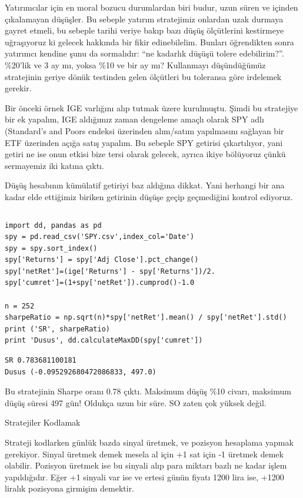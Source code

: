 \documentclass[12pt,fleqn]{article}\usepackage{../../common}
\begin{document}
Yatırımcılar için en moral bozucu durumlardan biri budur, uzun süren ve
içinden çıkalamayan düşüşler. Bu sebeple yatırım stratejimiz onlardan
uzak durmaya gayret etmeli, bu sebeple tarihi veriye bakıp bazı düşüş
ölçütlerini kestirmeye uğraşıyoruz ki gelecek hakkında bir fikir
edinebilelim. Bunları öğrendikten sonra yatırımcı kendine şunu da
sormalıdır: ``ne kadarlık düşüşü tolere edebilirim?''. \%20'lik ve 3 ay mı,
yoksa \%10 ve bir ay mı?  Kullanmayı düşündüğümüz stratejinin geriye dönük
testinden gelen ölçütleri bu toleransa göre irdelemek gerekir.

Bir önceki örnek IGE varlığını alıp tutmak üzere kurulmuştu. Şimdi bu
stratejiye bir ek yapalım, IGE aldığımız zaman dengeleme amaçlı olarak SPY
adlı (Standard's and Poors endeksi üzerinden alım/satım yapılmasını
sağlayan bir ETF üzerinden açığa satış yapalım. Bu sebeple SPY getirisi
çıkartılıyor, yani getiri ne ise onun etkisi bize tersi olarak gelecek,
ayrıca ikiye bölüyoruz çünkü sermayemiz iki katına çıktı.

Düşüş hesabının kümülatif getiriyi baz aldığına dikkat. Yani herhangi bir
ana kadar elde ettiğimiz biriken getirinin düşüşe geçip geçmediğini kontrol
ediyoruz.

\inputminted[fontsize=\footnotesize]{python}{dd.py}

\begin{verbatim}
import dd, pandas as pd
spy = pd.read_csv('SPY.csv',index_col='Date')
spy = spy.sort_index()
spy['Returns'] = spy['Adj Close'].pct_change()
spy['netRet']=(ige['Returns'] - spy['Returns'])/2.
spy['cumret']=(1+spy['netRet']).cumprod()-1.0

n = 252 
sharpeRatio = np.sqrt(n)*spy['netRet'].mean() / spy['netRet'].std()
print ('SR', sharpeRatio)
print 'Dusus', dd.calculateMaxDD(spy['cumret'])
\end{verbatim}

\begin{verbatim}
SR 0.783681100181
Dusus (-0.095292680472086833, 497.0)
\end{verbatim}

Bu stratejinin Sharpe oranı 0.78 çıktı. Maksimum düşüş \%10 civarı,
maksimum düşüş süresi 497 gün! Oldukça uzun bir süre. SO zaten çok yüksek
değil.

Stratejiler Kodlamak

Strateji kodlarken günlük bazda sinyal üretmek, ve pozisyon hesaplama yapmak
gerekiyor. Sinyal üretmek demek mesela al için +1 sat için -1 üretmek demek
olabilir. Pozisyon üretmek ise bu sinyali alıp para miktarı bazlı ne kadar işlem
yapıldığıdır. Eğer +1 sinyali var ise ve ertesi günün fiyatı 1200 lira ise, +1200
liralık pozisyona girmişim demektir.
\end{document}
